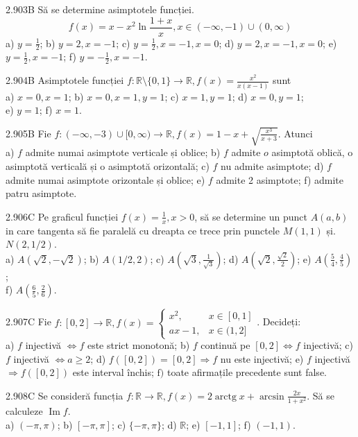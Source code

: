 \documentclass[11pt]{article}
\begin{document}
2.903B Să se determine asimptotele funcției. $$f(x)=x-x^{2} \ln \frac{1+x}{x}, x \in(-\infty,-1) \cup(0, \infty)$$ a) $y=\frac{1}{2}$; b) $y=2, x=-1$; c) $y=\frac{1}{2}, x=-1, x=0$; d) $y=2, x=-1, x=0$; e) $y=\frac{1}{2}, x=-1$; f) $y=-\frac{1}{2}, x=-1$.

2.904B Asimptotele funcției $f: \mathbb{R} \setminus\{0,1\} \rightarrow \mathbb{R}, f(x)=\frac{x^{2}}{x(x-1)}$ sunt\\ a) $x=0, x=1$; b) $x=0, x=1, y=1$; c) $x=1, y=1$; d) $x=0, y=1$;\\ e) $y=1$; f) $x=1$.

2.905B Fie $f:(-\infty,-3) \cup[0, \infty) \rightarrow \mathbb{R}, f(x)=1-x+\sqrt{\frac{x^{3}}{x+3}}$. Atunci\\ a) $f$ admite numai asimptote verticale și oblice; b) $f$ admite $o$ asimptotă oblică, o asimptotă verticală și o asimptotă orizontală; c) $f$ nu admite asimptote; d) $f$ admite numai asimptote orizontale și oblice; e) $f$ admite 2 asimptote; f) admite patru asimptote.

2.906C Pe graficul funcției $f(x)=\frac{1}{x}, x>0$, să se determine un punct $A(a, b)$ in care tangenta să fie paralelă cu dreapta ce trece prin punctele $M(1,1)$ și. $N(2,1 / 2)$.\\ a) $A(\sqrt{2},-\sqrt{2})$; b) $A(1 / 2,2)$; c) $A\left(\sqrt{3}, \frac{1}{\sqrt{3}}\right)$; d) $A\left(\sqrt{2}, \frac{\sqrt{2}}{2}\right)$; e) $A\left(\frac{5}{4}, \frac{4}{5}\right)$;\\ f) $A\left(\frac{6}{5}, \frac{2}{6}\right)$.

2.907C Fie $f:[0,2] \rightarrow \mathbb{R}, f(x)=\left\{\begin{array}{ll}x^{2}, & x \in[0,1] \\ a x-1, & x \in(1,2]\end{array}\right.$. Decideți:\\ a) $f$ injectivă $\Leftrightarrow f$ este strict monotonă; b) $f$ continuă pe $[0,2] \Leftrightarrow f$ injectivă; c) $f$ injectivă $\Leftrightarrow a \geq 2$; d) $f([0,2])=[0,2] \Rightarrow f$ nu este injectivă; e) $f$ injectivă $\Rightarrow f([0,2])$ este interval închis; $\mathrm{f})$ toate afirmațile precedente sunt false.

2.908C Se consideră funcția $f: \mathbb{R} \rightarrow \mathbb{R}, f(x)=2 \operatorname{arctg} x+\arcsin \frac{2 x}{1+x^{2}}$. Să se calculeze $\operatorname{Im} f$.\\ a) $(-\pi, \pi)$; b) $[-\pi, \pi]$; c) $\{-\pi, \pi\}$; d) $\mathbb{R}$; e) $[-1,1]$; f) $(-1,1)$.
\end{document}
